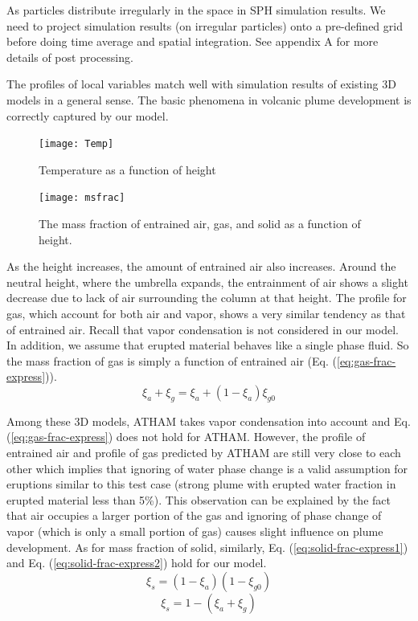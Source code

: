 \documentclass[gmd, manuscript]{copernicus}
\begin{document}
As particles distribute irregularly in the space in SPH simulation results. We need to project simulation results (on irregular particles) onto a pre-defined grid before doing time average and spatial integration. See appendix A for more details of post processing.

The profiles of local variables match well with simulation results of existing 3D models in a general sense. The basic phenomena in volcanic plume development is correctly captured by our model.

\begin{figure}
\center
\texttt{[image: Temp]}
\caption{Temperature as a function of height}
\label{fig:strong_local_temp}
\end{figure}

\begin{figure}
\texttt{[image: msfrac]}
\caption{The mass fraction of entrained air, gas, and solid as a function of height.}
\label{fig:strong_plume_mass_fraction}
\end{figure}

As the height increases, the amount of entrained air also increases. Around the neutral height, where the umbrella expands, the entrainment of air shows a slight decrease due to lack of air surrounding the column at that height. The profile for gas, which account for both air and vapor, shows a very similar tendency as that of entrained air. Recall that vapor condensation is not considered in our model. In addition, we assume that erupted material behaves like a single phase fluid. So the mass fraction of gas is simply a function of entrained air (Eq. (\ref{eq:gas-frac-express})).
\begin{equation}
\xi_a + \xi_g = \xi_a + \left(1-\xi_a\right) \xi_{g0}
\label{eq:gas-frac-express}
\end{equation}
 
Among these 3D models, ATHAM takes vapor condensation into account and Eq. (\ref{eq:gas-frac-express}) does not hold for ATHAM. However, the profile of entrained air and profile of gas predicted by ATHAM are still very close to each other which implies that ignoring of water phase change is a valid assumption for eruptions similar to this test case (strong plume with erupted water fraction in erupted material less than 5\%). This observation can be explained by the fact that air occupies a larger portion of the gas and ignoring of phase change of vapor (which is only a small portion of gas) causes slight influence on plume development. As for mass fraction of solid, similarly, Eq. (\ref{eq:solid-frac-express1}) and Eq. (\ref{eq:solid-frac-express2}) hold for our model. 
\begin{equation}
\xi_s = \left(1 - \xi_a\right) \left(1- \xi_{g0}\right)
\label{eq:solid-frac-express1}
\end{equation}
\begin{equation}
\xi_s = 1 - \left(\xi_a + \xi_g\right)
\label{eq:solid-frac-express2}
\end{equation}
\end{document}

